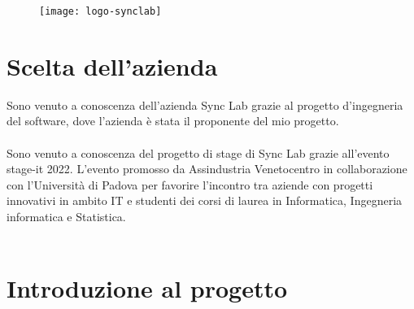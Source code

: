 \begin{figure}[H]
    \centering
    \texttt{[image: logo-synclab]}
\end{figure}

\section{Scelta dell'azienda}

Sono venuto a conoscenza dell'azienda Sync Lab grazie al progetto d'ingegneria del
software, dove l'azienda è stata il proponente del mio progetto.
\\\\
Sono venuto a conoscenza del progetto di stage di Sync Lab grazie all'evento stage-it 2022. 
L’evento promosso da Assindustria Venetocentro in collaborazione con l’Università 
di Padova per favorire l’incontro tra aziende con progetti innovativi in ambito IT e 
studenti dei corsi di laurea in Informatica, Ingegneria informatica e Statistica.
\\\\


\section{Introduzione al progetto}

